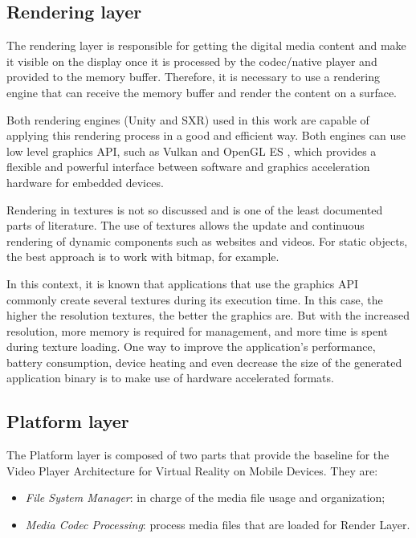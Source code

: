 \documentclass[runningheads]{llncs}
\begin{document}
\subsection{Rendering layer}
The rendering layer is responsible for getting the digital media content and make it visible on the display once it is processed by the codec/native player and provided to the memory buffer. Therefore, it is necessary to use a rendering engine that can receive the memory buffer and render the content on a surface.

Both rendering engines (Unity and SXR) used in this work are capable of applying this rendering process in a good and efficient way. Both engines can use low level graphics API, such as Vulkan \cite{VULKAN} and OpenGL ES \cite{OPENGLES}, which provides a flexible and powerful interface between software and graphics acceleration hardware for embedded devices.

Rendering in textures is not so discussed and is one of the least documented parts of literature. The use of textures allows the update and continuous rendering of dynamic components such as websites and videos. For static objects, the best approach is to work with bitmap, for example.

In this context, it is known that applications that use the graphics API commonly create several textures during its execution time. In this case, the higher the resolution textures, the better the graphics are. But with the increased resolution, more memory is required for management, and more time is spent during texture loading. One way to improve the application's performance, battery consumption, device heating and even decrease the size of the generated application binary is to make use of hardware accelerated formats.

\subsection{Platform layer}
The Platform layer is composed of two parts that provide the baseline for the Video Player Architecture for Virtual Reality on Mobile Devices. They are:

\begin{itemize}
    \item \textit{File System Manager}: in charge of the media file usage and organization;
    \item \textit{Media Codec Processing}: process media files that are loaded for Render Layer.
\end{itemize}
\end{document}
